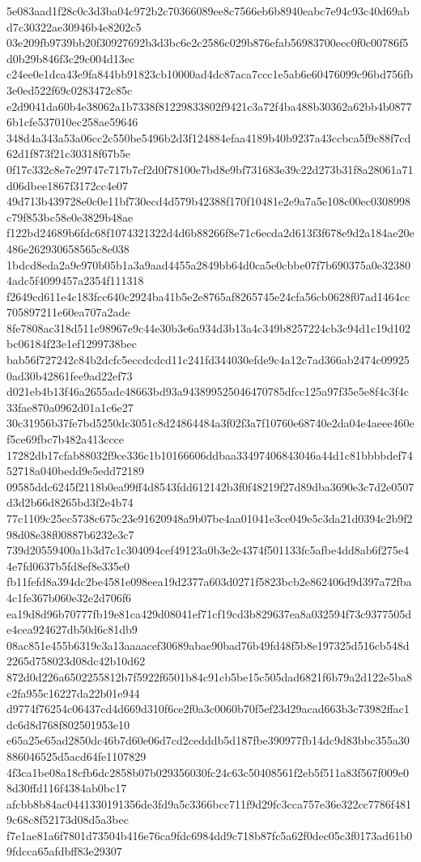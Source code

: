 {5e083aad1f28c0c3d3ba04c972b2c70366089ee8c7566eb6b8940eabc7e94c93c40d69abd7c30322ae30946b4e8202c5
03e209fb9739bb20f30927692b3d3bc6e2c2586c029b876efab56983700eec0f0c00786f5d0b29b846f3c29c004d13ec
c24ee0e1dca43e9fa844bb91823cb10000ad4dc87aca7ccc1e5ab6e60476099c96bd756fb3e0ed522f69c0283472c85c
e2d9041da60b4e38062a1b7338f81229833802f9421c3a72f4ba488b30362a62bb4b08776b1cfe537010ec258ae59646
348d4a343a53a06cc2c550be5496b2d3f124884efaa4189b40b9237a43ccbca5f9c88f7cd62d1f873f21c30318f67b5e
0f17c332c8e7e29747c717b7cf2d0f78100e7bd8e9bf731683e39c22d273b31f8a28061a71d06dbee1867f3172cc4e07
49d713b439728e0c0e11bf730ecd4d579b42388f170f10481e2e9a7a5e108c00ec0308998c79f853bc58e0e3829b48ae
f122bd24689b6fdc68f1074321322d4d6b88266f8e71c6ecda2d613f3f678e9d2a184ae20e486e262930658565c8e038
1bdcd8eda2a9e970b05b1a3a9aad4455a2849bb64d0ca5e0cbbe07f7b690375a0e323804adc5f4099457a2354f111318
f2649cd611e4c183fcc640c2924ba41b5e2e8765af8265745e24cfa56cb0628f07ad1464cc705897211e60ea707a2ade
8fe7808ac318d511e98967e9c44e30b3e6a934d3b13a4c349b8257224cb3c94d1c19d102bc06184f23e1ef1299738bec
bab56f727242c84b2dcfc5eccdcdcd11c241fd344030efde9c4a12c7ad366ab2474c099250ad30b42861fee9ad22ef73
d021eb4b13f46a2655adc48663bd93a943899525046470785dfcc125a97f35e5e8f4c3f4c33fae870a0962d01a1c6e27
30c31956b37fe7bd5250dc3051c8d24864484a3f02f3a7f10760e68740e2da04e4aeee460ef5ce69fbc7b482a413ccce
17282db17cfab88032f9ce336c1b10166606ddbaa33497406843046a44d1c81bbbbdef7452718a040bedd9e5edd72189
09585ddc6245f2118b0ea99ff4d8543fdd612142b3f0f48219f27d89dba3690e3c7d2e0507d3d2b66d8265bd3f2e4b74
77c1109c25ec5738c675c23e91620948a9b07be4aa01041e3ce049e5c3da21d0394c2b9f298d08e38f00887b6232e3c7
739d20559400a1b3d7c1c304094cef49123a0b3e2e4374f501133fc5afbe4dd8ab6f275e44e7fd0637b5fd8ef8e335e0
fb11fefd8a394dc2be4581e098eea19d2377a603d0271f5823bcb2e862406d9d397a72fba4c1fe367b060e32e2d706f6
ea19d8d96b70777fb19e81ca429d08041ef71cf19cd3b829637ea8a032594f73c9377505de4cea924627db50d6c81db9
08ac851e455b6319c3a13aaaacef30689abae90bad76b49fd48f5b8e197325d516cb548d2265d758023d08dc42b10d62
872d0d226a6502255812b7f5922f6501b84c91cb5be15c505dad6821f6b79a2d122e5ba8c2fa955c16227da22b01e944
d9774f76254c06437cd4d669d310f6ce2f0a3c0060b70f5ef23d29acad663b3c73982ffac1dc6d8d768f802501953e10
e65a25e65ad2850dc46b7d60e06d7cd2cedddb5d187fbe390977fb14dc9d83bbc355a30886046525d5acd64fe1107829
4f3ca1be08a18cfb6dc2858b07b029356030fc24c63c50408561f2eb5f511a83f567f009e08d30ffd116f4384ab0bc17
afcbb8b84ac0441330191356de3fd9a5c3366bcc711f9d29fc3cca757e36e322cc7786f4819c68c8f52173d08d5a3bec
f7e1ae81a6f7801d73504b416e76ca9fdc6984dd9c718b87fc5a62f0dec05c3f0173ad61b09fdcca65afdbff83e29307
}
